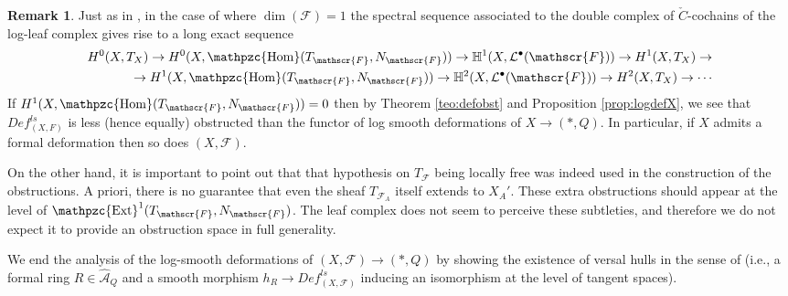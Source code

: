 \documentclass[reqno]{amsart}
\renewcommand\H{\mathbb{H}}
\newcommand{\F}{\mathscr{F}}
\renewcommand{\H}{\mathbb{H}}
\DeclareMathOperator{\sHom}{\mathpzc{Hom}}
\DeclareMathOperator{\sExt}{\mathpzc{Ext}}
\newcounter{Theorem}
\theoremstyle{definition}
\newtheorem{remark}[theorem]{Remark}
\theoremstyle{named}
\begin{document}
\begin{remark} \label{remark:LES}
    Just as in \cite[Theorem 1.6]{gomez1988transverse}, in the case of where $\dim(\F)=1$ the spectral sequence associated to the double complex of $\check{C}$-cochains of the log-leaf complex gives rise to a long exact sequence
\begin{align*}
    H^0(X,T_X)\to H^0(X,\sHom(T_\F,N_\F))\to \H^1(X,\mathcal{L}^\bullet(\F))\to H^1(X,T_X)\to \\ 
    \to H^1(X,\sHom(T_\F,N_\F))\to \H^2(X,\mathcal{L}^\bullet(\F))\to H^2(X,T_X)\to \cdots
\end{align*} 
If $H^1(X,\sHom(T_\F,N_\F))=0$ then by Theorem \ref{teo:defobst} and Proposition \ref{prop:logdefX}, we see that $Def^{ls}_{(X,F)}$ is less (hence equally) obstructed than the functor of log smooth deformations of $X\to (\ast,Q)$. In particular, if $X$
admits a formal deformation then so does $(X,\F)$.

On the other hand, it is important to point out that that hypothesis on $T_\F$ being locally free was indeed used in the construction of the obstructions. A priori, there is no guarantee that even the sheaf $T_{\F_A}$ itself extends to $X_A'$. These extra obstructions should appear at the level of $\sExt^1(T_\F,N_\F)$. The leaf complex does not seem to perceive these subtleties, and therefore we do not expect it to provide an obstruction space in full generality.
\end{remark}

We end the analysis of the log-smooth deformations of $(X,\F)\to (\ast,Q)$ by showing the existence of versal hulls in the sense of \cite{schlessinger1968functors} (i.e., a formal ring $R\in  \widehat{\mathcal A}_Q$ and a smooth morphism $h_R\to Def^{ls}_{(X,\F)}$ inducing an isomorphism at the level of tangent spaces).
\end{document}

